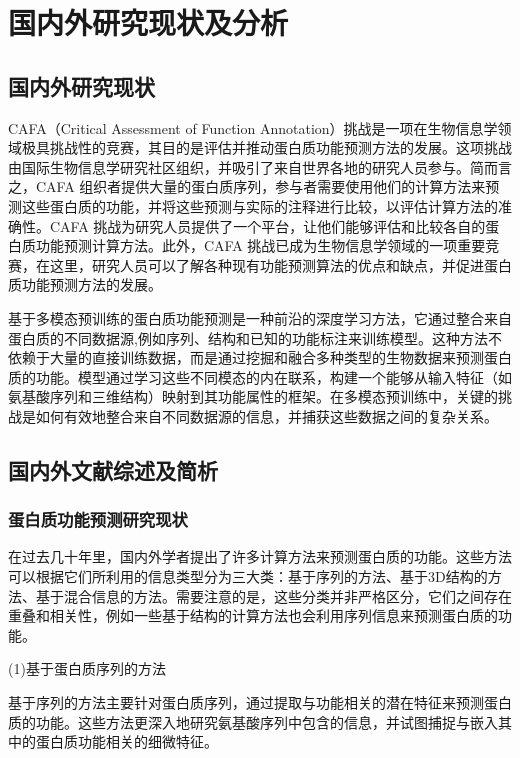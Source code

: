 

\chapter{国内外研究现状及分析}
\section{国内外研究现状}
CAFA（Critical Assessment of Function Annotation）\cite{zhou2019cafa}挑战是一项在生物信息学领域极具挑战性的竞赛，其目的是评估并推动蛋白质功能预测方法的发展。这项挑战由国际生物信息学研究社区组织，并吸引了来自世界各地的研究人员参与。简而言之，CAFA 组织者提供大量的蛋白质序列，参与者需要使用他们的计算方法来预测这些蛋白质的功能，并将这些预测与实际的注释进行比较，以评估计算方法的准确性。CAFA 挑战为研究人员提供了一个平台，让他们能够评估和比较各自的蛋白质功能预测计算方法。此外，CAFA 挑战已成为生物信息学领域的一项重要竞赛，在这里，研究人员可以了解各种现有功能预测算法的优点和缺点，并促进蛋白质功能预测方法的发展。

基于多模态预训练的蛋白质功能预测是一种前沿的深度学习方法，它通过整合来自蛋白质的不同数据源,例如序列、结构和已知的功能标注来训练模型。这种方法不依赖于大量的直接训练数据，而是通过挖掘和融合多种类型的生物数据来预测蛋白质的功能。模型通过学习这些不同模态的内在联系，构建一个能够从输入特征（如氨基酸序列和三维结构）映射到其功能属性的框架。在多模态预训练中，关键的挑战是如何有效地整合来自不同数据源的信息，并捕获这些数据之间的复杂关系。

\section{国内外文献综述及简析}
\subsection{蛋白质功能预测研究现状}
在过去几十年里，国内外学者提出了许多计算方法来预测蛋白质的功能。这些方法可以根据它们所利用的信息类型分为三大类：基于序列的方法、基于3D结构的方法、基于混合信息的方法。需要注意的是，这些分类并非严格区分，它们之间存在重叠和相关性，例如一些基于结构的计算方法也会利用序列信息来预测蛋白质的功能。

(1)基于蛋白质序列的方法

基于序列的方法主要针对蛋白质序列，通过提取与功能相关的潜在特征来预测蛋白质的功能。这些方法更深入地研究氨基酸序列中包含的信息，并试图捕捉与嵌入其中的蛋白质功能相关的细微特征。

